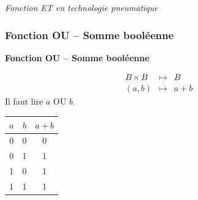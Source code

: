 \documentclass[11pt,oneside]{article}
\begin{document}
\begin{exemple}
\begin{minipage}[c]{.3\linewidth}
\begin{center}
\textit{Fonction ET en technologie pneumatique}
\end{center}
\end{minipage}
\end{exemple}


\subsubsection{Fonction OU -- Somme booléenne}


\begin{defi}
\textbf{Fonction OU -- Somme booléenne}

\begin{minipage}[c]{.45\linewidth}
\begin{eqnarray*}
B \times B &\longmapsto& B\\
(a,b) &\longmapsto& a + b
\end{eqnarray*}
Il faut lire $a$ OU $b$. 
\end{minipage} \hfill
\begin{minipage}[c]{.45\linewidth}
\begin{center}
\begin{tabular}{|c|c||c|}
\hline
$a$ & $b$ & $a+ b$ \\
\hline
0 & 0 & 0 \\ \hline
0 & 1 & 1 \\ \hline
1 & 0 & 1 \\ \hline
1 & 1 & 1 \\ \hline
\end{tabular}
\end{center}
\end{minipage}
\end{defi}
\end{document}
